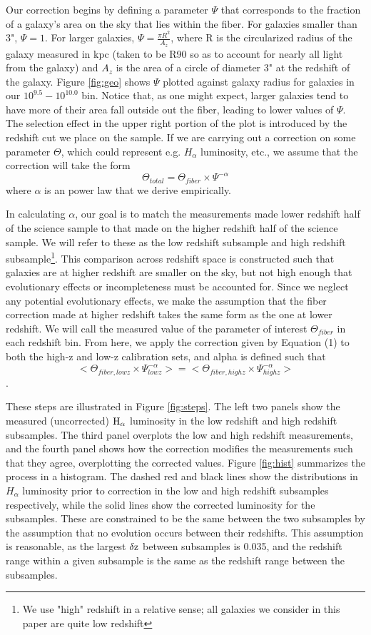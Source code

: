 \documentclass[iop]{emulateapj}
\begin{document}
Our correction begins by defining a parameter $\Psi$ that corresponds to the fraction of a galaxy's area on the sky that lies within the fiber. For galaxies smaller than 3", $\Psi = 1$. For larger galaxies, $\Psi = \frac{\pi R^2}{A_z}$, where R is the circularized radius of the galaxy measured in kpc (taken to be R90 so as to account for nearly all light from the galaxy) and $A_z$ is the area of a circle of diameter 3" at the redshift of the galaxy. Figure \ref{fig:geo} shows $\Psi$ plotted against galaxy radius for galaxies in our $10^{9.5}-10^{10.0}$ bin. Notice that, as one might expect, larger galaxies tend to have more of their area fall outside out the fiber, leading to lower values of $\Psi$. The selection effect in the upper right portion of the plot is introduced by the redshift cut we place on the sample. If we are carrying out a correction on some parameter $\Theta$, which could represent e.g. $H_{\alpha}$ luminosity, etc., we assume that the correction will take the form $$\Theta_{total} = \Theta_{fiber} \times \Psi^{-\alpha}$$ where $\alpha$ is an power law that we derive empirically.

In calculating $\alpha$, our goal is to match the measurements made lower redshift half of the science sample to that made on the higher redshift half of the science sample. We will refer to these as the low redshift subsample and high redshift subsample\footnote{We use "high" redshift in a relative sense; all galaxies we consider in this paper are quite low redshift}. This comparison across redshift space is constructed such that galaxies are at higher redshift are smaller on the sky, but not high enough that evolutionary effects or incompleteness must be accounted for. Since we neglect any potential evolutionary effects, we make the assumption that the fiber correction made at higher redshift takes the same form as the one at lower redshift. We will call the measured value of the parameter of interest $\Theta_{fiber}$ in each redshift bin. From here, we apply the correction given by Equation (1) to both the high-z and low-z calibration sets, and alpha is defined such that $$<\Theta_{fiber,lowz} \times \Psi_{lowz}^{-\alpha}> = <\Theta_{fiber,highz} \times \Psi_{highz}^{-\alpha}>$$.

These steps are illustrated in Figure \ref{fig:steps}. The left two panels show the measured (uncorrected) $\rm H_{\alpha}$ luminosity in the low redshift and high redshift subsamples. The third panel overplots the low and high redshift measurements, and the fourth panel shows how the correction modifies the measurements such that they agree, overplotting the corrected values. Figure \ref{fig:hist} summarizes the process in a histogram. The dashed red and black lines show the distributions in $H_{\alpha}$ luminosity prior to correction in the low and high redshift subsamples respectively, while the solid lines show the corrected luminosity for the subsamples. These are constrained to be the same between the two subsamples by the assumption that no evolution occurs between their redshifts. This assumption is reasonable, as the largest $\rm \delta z$ between subsamples is 0.035, and the redshift range within a given subsample is the same as the redshift range between the subsamples.
\end{document}
